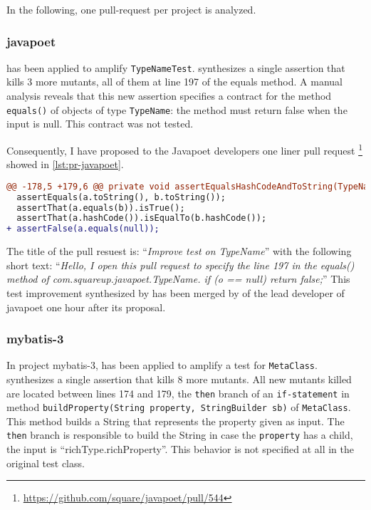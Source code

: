 In the following, one pull-request per project is analyzed.

\subsubsection{javapoet}

\dspot has been applied to amplify \texttt{TypeNameTest}. 
\dspot synthesizes a single assertion that kills 3 more mutants, all of them at line 197 of the equals method. 
A manual analysis reveals that this new assertion specifies a contract for the method \texttt{equals()} of objects of type \texttt{TypeName}: 
the method must return false when the input is null. 
This contract was not tested.

Consequently, I have proposed to the Javapoet developers one liner pull request \footnote{\url{https://github.com/square/javapoet/pull/544}} showed in \autoref{lst:pr-javapoet}.
\begin{lstlisting}[language=diff,caption=Test-improvement proposed to Javapoet developers.,label=lst:pr-javapoet]
@@ -178,5 +179,6 @@ private void assertEqualsHashCodeAndToString(TypeName a, TypeName b) {
  assertEquals(a.toString(), b.toString());
  assertThat(a.equals(b)).isTrue();
  assertThat(a.hashCode()).isEqualTo(b.hashCode());
+ assertFalse(a.equals(null));
\end{lstlisting}

The title of the pull resuest is: ``\emph{Improve test on TypeName}'' with the following short text: ``\emph{Hello, I open this pull request to specify the line 197 in the equals() method of com.squareup.javapoet.TypeName. if (o == null) return false;}''
This test improvement synthesized by \dspot has been merged by of the lead developer of javapoet one hour after its proposal.

\subsubsection{mybatis-3}

In project mybatis-3, \dspot has been applied to amplify a test for \texttt{MetaClass}. 
\dspot synthesizes a single assertion that kills 8 more mutants.
All new mutants killed are located between lines 174 and 179, \ie the \texttt{then} branch of an \texttt{if-statement} in method \texttt{buildProperty(String property, StringBuilder sb)} of \texttt{MetaClass}.
This method builds a String that represents the  property given as input. 
The \texttt{then} branch is responsible to build the String in case the \texttt{property} has a child, \eg the input is ``richType.richProperty''. 
This behavior is not specified at all in the original test class.

